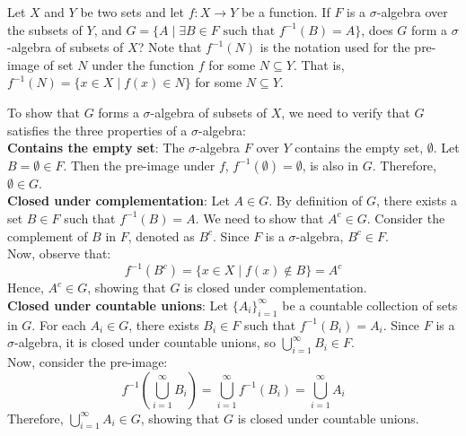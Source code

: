 \begin{exercise}
    Let \( X \) and \( Y \) be two sets and let \( f: X \rightarrow Y \) be a function. If \( F \) is a \(\sigma\)-algebra over the subsets of \( Y \), and \( G = \{ A \mid \exists B \in F \text{ such that } f^{-1}(B) = A \} \), does \( G \) form a \(\sigma\)-algebra of subsets of \( X \)?  Note that \( f^{-1}(N) \) is the notation used for the pre-image of set \( N \) under the function \( f \) for some \( N \subseteq Y \). That is, \( f^{-1}(N) = \{x \in X \mid f(x) \in N\} \) for some \( N \subseteq Y \).
\end{exercise}

\begin{solution}
    To show that \( G \) forms a \(\sigma\)-algebra of subsets of \( X \), we need to verify that \( G \) satisfies the three properties of a \(\sigma\)-algebra:\\

\textbf{Contains the empty set}:  The \(\sigma\)-algebra \( F \) over \( Y \) contains the empty set, \( \emptyset \). Let \( B = \emptyset \in F \). Then the pre-image under \( f \), \( f^{-1}(\emptyset) = \emptyset \), is also in \( G \). Therefore, \( \emptyset \in G \).\\

\textbf{Closed under complementation}:  Let \( A \in G \). By definition of \( G \), there exists a set \( B \in F \) such that \( f^{-1}(B) = A \). We need to show that \( A^c \in G \). Consider the complement of \( B \) in \( F \), denoted as \( B^c \). Since \( F \) is a \(\sigma\)-algebra, \( B^c \in F \).  \\

    Now, observe that:
    \[
    f^{-1}(B^c) = \{x \in X \mid f(x) \notin B\} = A^c
    \]
    Hence, \( A^c \in G \), showing that \( G \) is closed under complementation.\\

    \textbf{Closed under countable unions}: Let \( \{A_i\}_{i=1}^{\infty} \) be a countable collection of sets in \( G \). For each \( A_i \in G \), there exists \( B_i \in F \) such that \( f^{-1}(B_i) = A_i \). Since \( F \) is a \(\sigma\)-algebra, it is closed under countable unions, so \( \bigcup_{i=1}^{\infty} B_i \in F \). \\

    Now, consider the pre-image:
    \[
    f^{-1}\left(\bigcup_{i=1}^{\infty} B_i\right) = \bigcup_{i=1}^{\infty} f^{-1}(B_i) = \bigcup_{i=1}^{\infty} A_i
    \]
    Therefore, \( \bigcup_{i=1}^{\infty} A_i \in G \), showing that \( G \) is closed under countable unions.
\end{solution}

